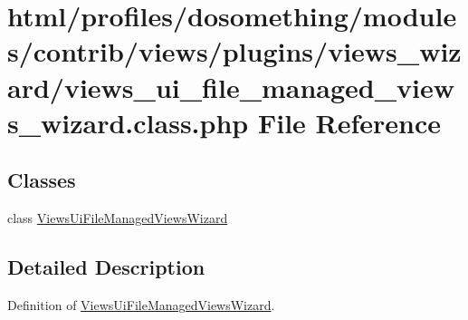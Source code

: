 \hypertarget{views__ui__file__managed__views__wizard_8class_8php}{
\section{html/profiles/dosomething/modules/contrib/views/plugins/views\_\-wizard/views\_\-ui\_\-file\_\-managed\_\-views\_\-wizard.class.php File Reference}
\label{views__ui__file__managed__views__wizard_8class_8php}
}
\subsection*{Classes}
\begin{DoxyCompactItemize}
\item 
class \hyperlink{classViewsUiFileManagedViewsWizard}{ViewsUiFileManagedViewsWizard}
\end{DoxyCompactItemize}


\subsection{Detailed Description}
Definition of \hyperlink{classViewsUiFileManagedViewsWizard}{ViewsUiFileManagedViewsWizard}. 